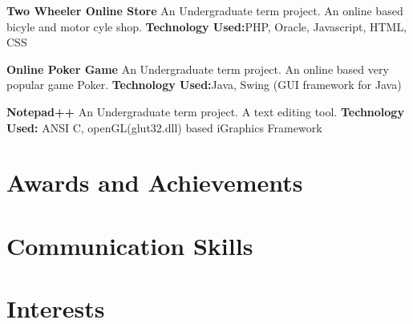 \documentclass[11pt,a4paper,sans]{moderncv}
\begin{document}

{
\textbf{Two Wheeler Online Store}
\newline
An Undergraduate term project. An online based bicyle and motor cyle shop.
\newline \textbf{Technology Used:}PHP, Oracle, Javascript, HTML, CSS
\newline
}

{
\textbf{Online Poker Game}
\newline
An Undergraduate term project. An online based very popular game Poker.
\newline \textbf{Technology Used:}Java, Swing (GUI framework for Java)
\newline
}

{
\textbf{Notepad++}\newline
An Undergraduate term project. A text editing tool.
\newline \textbf{Technology Used:} ANSI C, openGL(glut32.dll) based iGraphics Framework
\newline
}





\section{Awards and Achievements}



\section{Communication Skills}



\section{Interests}
\end{document}
